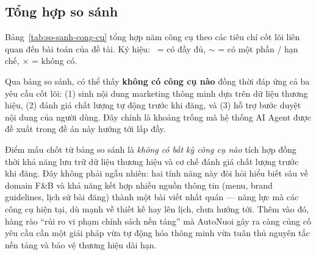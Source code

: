 \subsection{Tổng hợp so sánh}

Bảng~\ref{tab:so-sanh-cong-cu} tổng hợp năm công cụ theo các tiêu chí
cốt lõi liên quan đến bài toán của đề tài. Ký hiệu: \checkmark\ = có
đầy đủ, $\sim$ = có một phần / hạn chế, $\times$ = không có.

\begin{table}[htbp]
\centering
\caption{So sánh các công cụ/sản phẩm hiện có trên thị trường.}
\label{tab:so-sanh-cong-cu}
\small
{}
\end{table}

Qua bảng so sánh, có thể thấy \textbf{không có công cụ nào} đồng thời
đáp ứng cả ba yêu cầu cốt lõi: (1) sinh nội dung marketing thông minh
dựa trên dữ liệu thương hiệu, (2) đánh giá chất lượng tự động trước khi
đăng, và (3) hỗ trợ bước duyệt nội dung của người dùng. Đây chính là
khoảng trống mà hệ thống AI Agent được đề xuất trong đề án này hướng
tới lấp đầy.

Điểm mấu chốt từ bảng so sánh là \emph{không có bất kỳ công cụ nào}
tích hợp đồng thời khả năng lưu trữ dữ liệu thương hiệu và cơ chế đánh
giá chất lượng trước khi đăng. Đây không phải ngẫu nhiên: hai tính năng
này đòi hỏi hiểu biết sâu về domain F\&B và khả năng kết hợp nhiều
nguồn thông tin (menu, brand guidelines, lịch sử bài đăng) thành một
bài viết nhất quán --- năng lực mà các công cụ hiện tại, dù mạnh về
thiết kế hay lên lịch, chưa hướng tới. Thêm vào đó, hàng rào ``rủi ro
vi phạm chính sách nền tảng'' mà AutoNuoi gây ra càng củng cố yêu cầu
cần một giải pháp vừa tự động hóa thông minh vừa tuân thủ nguyên tắc
nền tảng và bảo vệ thương hiệu dài hạn.

